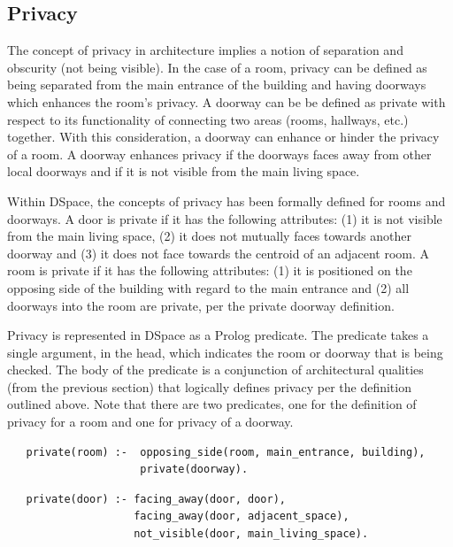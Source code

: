 \documentclass[12pt]{ucthesis}
\begin{document}
\subsection{Privacy}
The concept of privacy in architecture implies a notion of separation and obscurity (not being visible). In the case of a room, privacy can be defined as being separated from the main entrance of the building and having doorways which enhances the room's privacy. A doorway can be be defined as private with respect to its functionality of connecting two areas (rooms, hallways, etc.) together. With this consideration, a doorway can enhance or hinder the privacy of a room. A doorway enhances privacy if the doorways faces away from other local doorways and if it is not visible from the main living space. 

Within DSpace, the concepts of privacy has been formally defined for rooms and doorways. A door is private if it has the following attributes: (1) it is not visible from the main living space, (2) it does not mutually faces towards another doorway and (3) it does not face towards the centroid of an adjacent room. A room is private if it has the following attributes: (1) it is positioned on the opposing side of the building with regard to the main entrance and (2) all doorways into the room are private, per the private doorway definition.
 
Privacy is represented in DSpace as a Prolog predicate. The predicate takes a single argument, in the head, which indicates the room or doorway that is being checked. The body of the predicate is a conjunction of architectural qualities (from the previous section) that logically defines privacy per the definition outlined above. Note that there are two predicates, one for the definition of privacy for a room and one for privacy of a doorway.  

\begin{verbatim}
   private(room) :-  opposing_side(room, main_entrance, building), 
                     private(doorway).
\end{verbatim}  

\begin{verbatim}
   private(door) :- facing_away(door, door),
                    facing_away(door, adjacent_space),
                    not_visible(door, main_living_space). 
\end{verbatim}
\end{document}
